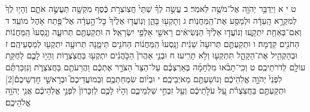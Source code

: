 \documentclass[twoside, openany, parskip=half, 11pt]{book}
\begin{document}
ט י א וַיְדַבֵּ֥ר יְהֹוָ֖ה אֶל־מֹשֶׁ֥ה לֵּאמֹֽר׃ ב עֲשֵׂ֣ה לְךָ֗ שְׁתֵּי֙ חֲצֽוֹצְרֹ֣ת כֶּ֔סֶף מִקְשָׁ֖ה תַּעֲשֶׂ֣ה אֹתָ֑ם וְהָי֤וּ לְךָ֙ לְמִקְרָ֣א הָֽעֵדָ֔ה וּלְמַסַּ֖ע אֶת־הַֽמַּחֲנֽוֹת׃ ג וְתָקְע֖וּ בָּהֵ֑ן וְנֽוֹעֲד֤וּ אֵלֶ֙יךָ֙ כׇּל־הָ֣עֵדָ֔ה אֶל־פֶּ֖תַח אֹ֥הֶל מוֹעֵֽד׃ ד וְאִם־בְּאַחַ֖ת יִתְקָ֑עוּ וְנוֹעֲד֤וּ אֵלֶ֙יךָ֙ הַנְּשִׂיאִ֔ים רָאשֵׁ֖י אַלְפֵ֥י יִשְׂרָאֵֽל׃ ה וּתְקַעְתֶּ֖ם תְּרוּעָ֑ה וְנָֽסְעוּ֙ הַֽמַּחֲנ֔וֹת הַחֹנִ֖ים קֵֽדְמָה׃ ו וּתְקַעְתֶּ֤ם תְּרוּעָה֙ שֵׁנִ֔ית וְנָֽסְעוּ֙ הַֽמַּחֲנ֔וֹת הַחֹנִ֖ים תֵּימָ֑נָה תְּרוּעָ֥ה יִתְקְע֖וּ לְמַסְעֵיהֶֽם׃ ז וּבְהַקְהִ֖יל אֶת־הַקָּהָ֑ל תִּתְקְע֖וּ וְלֹ֥א תָרִֽיעוּ׃ ח וּבְנֵ֤י אַהֲרֹן֙ הַכֹּ֣הֲנִ֔ים יִתְקְע֖וּ בַּחֲצֹֽצְר֑וֹת וְהָי֥וּ לָכֶ֛ם לְחֻקַּ֥ת עוֹלָ֖ם לְדֹרֹתֵיכֶֽם׃ ט וְכִֽי־תָבֹ֨אוּ מִלְחָמָ֜ה בְּאַרְצְכֶ֗ם עַל־הַצַּר֙ הַצֹּרֵ֣ר אֶתְכֶ֔ם וַהֲרֵעֹתֶ֖ם בַּחֲצֹצְרֹ֑ת וְנִזְכַּרְתֶּ֗ם לִפְנֵי֙ יְהֹוָ֣ה אֱלֹֽהֵיכֶ֔ם וְנוֹשַׁעְתֶּ֖ם מֵאֹיְבֵיכֶֽם׃ י וּבְי֨וֹם שִׂמְחַתְכֶ֥ם וּֽבְמוֹעֲדֵיכֶם֮ וּבְרָאשֵׁ֣י חׇדְשֵׁיכֶם֒‏[2] וּתְקַעְתֶּ֣ם בַּחֲצֹֽצְרֹ֗ת עַ֚ל עֹלֹ֣תֵיכֶ֔ם וְעַ֖ל זִבְחֵ֣י שַׁלְמֵיכֶ֑ם וְהָי֨וּ לָכֶ֤ם לְזִכָּרוֹן֙ לִפְנֵ֣י אֱלֹֽהֵיכֶ֔ם אֲנִ֖י יְהֹוָ֥ה אֱלֹהֵיכֶֽם׃
\end{document}
